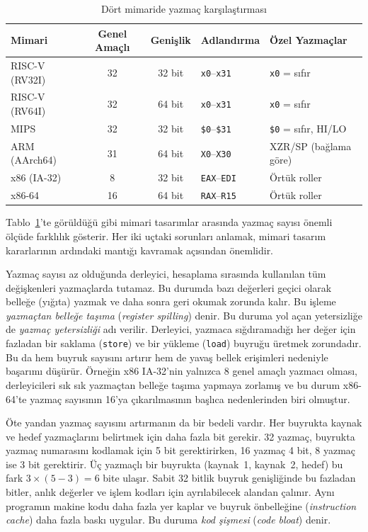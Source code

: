 \begin{table}[H]
\centering
\caption{Dört mimaride yazmaç karşılaştırması}
\label{tab:yazmac-karsilastirma}
\small
\begin{tabular}{lccll}
\toprule
\textbf{Mimari} & \textbf{Genel Amaçlı} & \textbf{Genişlik} & \textbf{Adlandırma} & \textbf{Özel Yazmaçlar} \\
\midrule
RISC-V (RV32I) & 32 & 32 bit & \texttt{x0}--\texttt{x31} & \texttt{x0} = sıfır \\
RISC-V (RV64I) & 32 & 64 bit & \texttt{x0}--\texttt{x31} & \texttt{x0} = sıfır \\
MIPS            & 32 & 32 bit & \texttt{\$0}--\texttt{\$31} & \texttt{\$0} = sıfır, HI/LO \\
ARM (AArch64)   & 31 & 64 bit & \texttt{X0}--\texttt{X30} & XZR/SP (bağlama göre) \\
x86 (IA-32)     & 8  & 32 bit & \texttt{EAX}--\texttt{EDI} & Örtük roller \\
x86-64          & 16 & 64 bit & \texttt{RAX}--\texttt{R15} & Örtük roller \\
\bottomrule
\end{tabular}
\end{table}

Tablo~\ref{tab:yazmac-karsilastirma}'te görüldüğü gibi mimari tasarımlar arasında yazmaç sayısı önemli ölçüde farklılık gösterir. Her iki uçtaki sorunları anlamak, mimari tasarım kararlarının ardındaki mantığı kavramak açısından önemlidir.

Yazmaç sayısı az olduğunda derleyici, hesaplama sırasında kullanılan tüm değişkenleri yazmaçlarda tutamaz. Bu durumda bazı değerleri geçici olarak belleğe (yığıta) yazmak ve daha sonra geri okumak zorunda kalır. Bu işleme \emph{yazmaçtan belleğe taşıma} (\emph{register spilling}) denir. Bu duruma yol açan yetersizliğe de \emph{yazmaç yetersizliği} adı verilir. Derleyici, yazmaca sığdıramadığı her değer için fazladan bir saklama (\texttt{store}) ve bir yükleme (\texttt{load}) buyruğu üretmek zorundadır. Bu da hem buyruk sayısını artırır hem de yavaş bellek erişimleri nedeniyle başarımı düşürür. Örneğin x86 IA-32'nin yalnızca 8 genel amaçlı yazmacı olması, derleyicileri sık sık yazmaçtan belleğe taşıma yapmaya zorlamış ve bu durum x86-64'te yazmaç sayısının 16'ya çıkarılmasının başlıca nedenlerinden biri olmuştur.

Öte yandan yazmaç sayısını artırmanın da bir bedeli vardır. Her buyrukta kaynak ve hedef yazmaçlarını belirtmek için daha fazla bit gerekir. 32 yazmaç, buyrukta yazmaç numarasını kodlamak için 5 bit gerektirirken, 16 yazmaç 4 bit, 8 yazmaç ise 3 bit gerektirir. Üç yazmaçlı bir buyrukta (kaynak~1, kaynak~2, hedef) bu fark $3 \times (5 - 3) = 6$ bite ulaşır. Sabit 32 bitlik buyruk genişliğinde bu fazladan bitler, anlık değerler ve işlem kodları için ayrılabilecek alandan çalınır. Aynı programın makine kodu daha fazla yer kaplar ve buyruk önbelleğine (\emph{instruction cache}) daha fazla baskı uygular. Bu duruma \emph{kod şişmesi} (\emph{code bloat}) denir.

